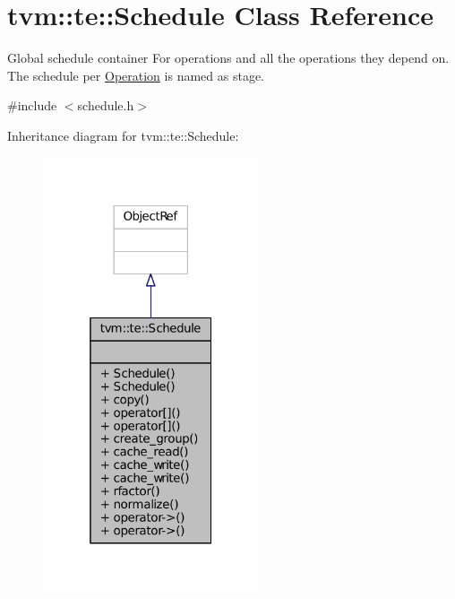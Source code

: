 \hypertarget{classtvm_1_1te_1_1Schedule}{}\section{tvm\+:\+:te\+:\+:Schedule Class Reference}
\label{classtvm_1_1te_1_1Schedule}


Global schedule container For operations and all the operations they depend on. The schedule per \hyperlink{classtvm_1_1te_1_1Operation}{Operation} is named as stage.  




{\ttfamily \#include $<$schedule.\+h$>$}



Inheritance diagram for tvm\+:\+:te\+:\+:Schedule\+:
\nopagebreak
\begin{figure}[H]
\begin{center}
\leavevmode
\includegraphics[width=181pt]{classtvm_1_1te_1_1Schedule__inherit__graph}
\end{center}
\end{figure}


